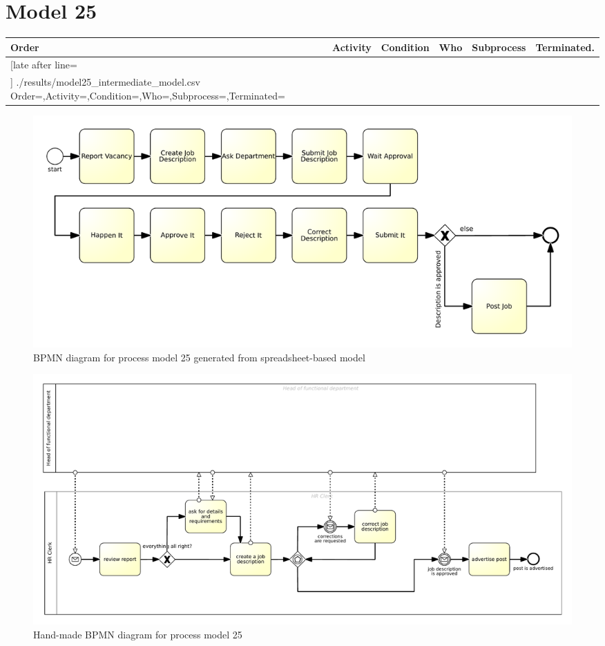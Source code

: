 \section{Model 25}
\begin{tcolorbox}[
	breakable,
	arc=0mm,
	left=1pt,
	right = 1pt,
	boxrule=0mm,
	colback = {white},
	]
	\texttt{}
\end{tcolorbox}
\label{txt:model25}
\newpage
{\scriptsize
	\begin{longtable}{|p{0.03 \hsize}|p{0.25 \hsize}|p{0.15 \hsize}|p{0.2 \hsize}|p{0.1 \hsize}|p{0.1 \hsize}|}
		\hline
		Order & Activity & Condition & Who & Subprocess & Terminated.
		\\\hline\hline
		\csvreader[late after line=\\\hline]
		{./results/model25_intermediate_model.csv}
		{Order=\Order,Activity=\Activity,Condition=\Condition,Who=\Who,Subprocess=\Subprocess,Terminated=\Terminated}
		{\Order & \Activity & \Condition & \Who & \Subprocess & \Terminated}
		\caption{Spreadsheet-based description for process model 25}
		\label{csv:model25}
	\end{longtable}
}

\begin{figure}[H]
	\centering
	\includegraphics[width=\hsize]{./generated_bpmn/model25.pdf}
	\caption{BPMN diagram for process model 25 generated from spreadsheet-based model}
	\label{bpmn:generated_model25}
\end{figure}

\begin{figure}[H]
	\centering
	\includegraphics[width=\hsize]{./bpmn/model25.pdf}
	\caption{Hand-made BPMN diagram for process model 25}
	\label{bpmn:model25}
\end{figure}

